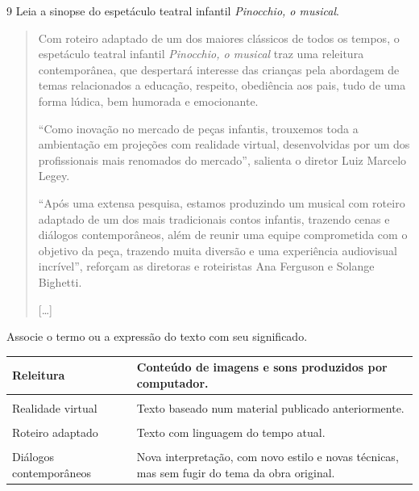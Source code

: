

\num{9} Leia a sinopse do espetáculo teatral infantil \emph{Pinocchio, o musical}.

\begin{quote}
Com roteiro adaptado de um dos maiores clássicos de todos os tempos, o
espetáculo teatral infantil \textit{Pinocchio, o musical} traz uma releitura
contemporânea, que despertará interesse das crianças pela abordagem de
temas relacionados a educação, respeito, obediência aos pais, tudo de
uma forma lúdica, bem humorada e emocionante.

“Como inovação no mercado de peças infantis, trouxemos toda a
ambientação em projeções com realidade virtual, desenvolvidas por um dos
profissionais mais renomados do mercado”, salienta o diretor Luiz
Marcelo Legey.

“Após uma extensa pesquisa, estamos produzindo um musical com roteiro
adaptado de um dos mais tradicionais contos infantis, trazendo cenas e
diálogos contemporâneos, além de reunir uma equipe comprometida com o
objetivo da peça, trazendo muita diversão e uma experiência audiovisual
incrível”, reforçam as diretoras e roteiristas Ana Ferguson e Solange
Bighetti.

{[}\ldots{}{]}

\end{quote}

Associe o termo ou a expressão do texto com seu significado.

\begin{longtable}[]{@{}lll@{}}
\toprule
Releitura & & Conteúdo de imagens e sons produzidos por
computador.\tabularnewline
\midrule
\endhead
& &\tabularnewline
Realidade virtual & & Texto baseado num material publicado
anteriormente.\tabularnewline
& &\tabularnewline
Roteiro adaptado & & Texto com linguagem do tempo atual.\tabularnewline
& &\tabularnewline
Diálogos contemporâneos & & Nova interpretação, com novo estilo e novas
técnicas, mas sem fugir do tema da obra original.\tabularnewline
\bottomrule
\end{longtable}


